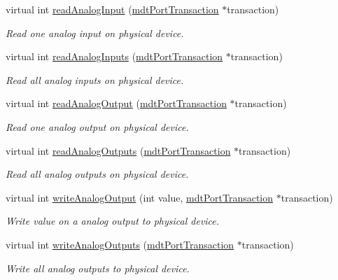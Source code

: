 \begin{DoxyCompactItemize}
\item 
virtual int \hyperlink{classmdt_device_acecf7934ce29b3a957accb0f4c98c746}{readAnalogInput} (\hyperlink{classmdt_port_transaction}{mdtPortTransaction} $\ast$transaction)
\begin{DoxyCompactList}\small\item\em Read one analog input on physical device. \end{DoxyCompactList}\item 
virtual int \hyperlink{classmdt_device_a40674e7bf0c367bb3edb407d73a5bd8e}{readAnalogInputs} (\hyperlink{classmdt_port_transaction}{mdtPortTransaction} $\ast$transaction)
\begin{DoxyCompactList}\small\item\em Read all analog inputs on physical device. \end{DoxyCompactList}\item 
virtual int \hyperlink{classmdt_device_a7934063c3f41a742515f1232c9598c2a}{readAnalogOutput} (\hyperlink{classmdt_port_transaction}{mdtPortTransaction} $\ast$transaction)
\begin{DoxyCompactList}\small\item\em Read one analog output on physical device. \end{DoxyCompactList}\item 
virtual int \hyperlink{classmdt_device_ab0232ac83c38bc93d3bc2aa91d94c291}{readAnalogOutputs} (\hyperlink{classmdt_port_transaction}{mdtPortTransaction} $\ast$transaction)
\begin{DoxyCompactList}\small\item\em Read all analog outputs on physical device. \end{DoxyCompactList}\item 
virtual int \hyperlink{classmdt_device_ae764634bba2b321ac2b4731c0353e45f}{writeAnalogOutput} (int value, \hyperlink{classmdt_port_transaction}{mdtPortTransaction} $\ast$transaction)
\begin{DoxyCompactList}\small\item\em Write value on a analog output to physical device. \end{DoxyCompactList}\item 
virtual int \hyperlink{classmdt_device_abc52b797df29945bf0a6358aab1b7245}{writeAnalogOutputs} (\hyperlink{classmdt_port_transaction}{mdtPortTransaction} $\ast$transaction)
\begin{DoxyCompactList}\small\item\em Write all analog outputs to physical device. \end{DoxyCompactList}\item 

\end{DoxyCompactItemize}
